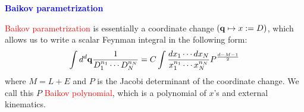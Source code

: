 \documentclass[10pt]{article}
\begin{document}
\textbf{\textcolor{blue}{Baikov parametrization}}

\textcolor{red}{Baikov parametrization} is essentially a coordinate change $(\bold{q} \mapsto x:=D)$, which allows us to write a scalar Feynman integral in the following form:
\begin{eqnarray}
\nonumber
\int d^d \bold{q} \frac{1}{D_1^{n_1} \cdots D_N^{n_N}}
=
C \int \frac{dx_1 \cdots dx_N}{x_1^{n_1}\cdots x_N^{n_N}} P^{\frac{d-M-1}{2}}
\end{eqnarray}
where $M = L+E$ and $P$ is the Jacobi determinant of the coordinate change.
We call this $P$ \textcolor{red}{Baikov polynomial}, which is a polynomial of $x$'s and external kinematics.
\end{document}
